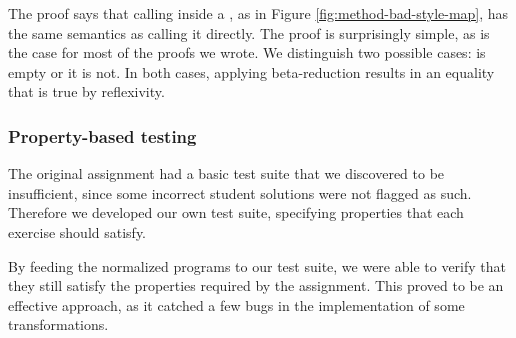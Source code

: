 The proof says that calling  inside a , as in Figure \ref{fig:method-bad-style-map}, has the same semantics as calling it directly. The proof is surprisingly simple, as is the case for most of the proofs we wrote. We distinguish two possible cases:  is empty or it is not. In both cases, applying beta-reduction results in an equality that is true by reflexivity.

\subsubsection{Property-based testing}
\label{sec:method-testing}

The original assignment had a basic test suite that we discovered to be insufficient, since some incorrect student solutions were not flagged as such. Therefore we developed our own test suite, specifying properties that each exercise should satisfy.

By feeding the normalized programs to our test suite, we were able to verify that they still satisfy the properties required by the assignment. This proved to be an effective approach, as it catched a few bugs in the implementation of some transformations.
